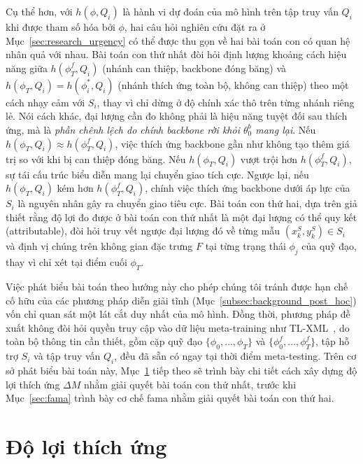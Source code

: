 Cụ thể hơn, với $h(\phi, Q_i)$ là hành vi dự đoán của mô hình trên tập truy vấn $Q_i$ khi được tham số hóa bởi $\phi$, hai câu hỏi nghiên cứu đặt ra ở Mục~\ref{sec:research_urgency} có thể được thu gọn về hai bài toán con có quan hệ nhân quả với nhau. Bài toán con thứ nhất đòi hỏi định lượng khoảng cách hiệu năng giữa $h(\phi_T^{f}, Q_i)$ (nhánh can thiệp, backbone đóng băng) và $h(\phi_T, Q_i) = h(\phi_i^*, Q_i)$ (nhánh thích ứng toàn bộ, không can thiệp) theo một cách nhạy cảm với $S_i$, thay vì chỉ dừng ở độ chính xác thô trên từng nhánh riêng lẻ. Nói cách khác, đại lượng cần đo không phải là hiệu năng tuyệt đối sau thích ứng, mà là \emph{phần chênh lệch do chính backbone rời khỏi $\theta_0^{b}$ mang lại}. Nếu $h(\phi_T, Q_i) \approx h(\phi_T^{f}, Q_i)$, việc thích ứng backbone gần như không tạo thêm giá trị so với khi bị can thiệp đóng băng. Nếu $h(\phi_T, Q_i)$ vượt trội hơn $h(\phi_T^{f}, Q_i)$, sự tái cấu trúc biểu diễn mang lại chuyển giao tích cực. Ngược lại, nếu $h(\phi_T, Q_i)$ kém hơn $h(\phi_T^{f}, Q_i)$, chính việc thích ứng backbone dưới áp lực của $S_i$ là nguyên nhân gây ra chuyển giao tiêu cực. Bài toán con thứ hai, dựa trên giả thiết rằng độ lợi đo được ở bài toán con thứ nhất là một đại lượng có thể quy kết (attributable), đòi hỏi truy vết ngược đại lượng đó về từng mẫu $(x_k^S, y_k^S) \in S_i$ và định vị chúng trên không gian đặc trưng $F$ tại từng trạng thái $\phi_j$ của quỹ đạo, thay vì chỉ xét tại điểm cuối $\phi_T$.

Việc phát biểu bài toán theo hướng này cho phép chúng tôi tránh được hạn chế cố hữu của các phương pháp diễn giải tĩnh (Mục~\ref{subsec:background_post_hoc}) vốn chỉ quan sát một lát cắt duy nhất của mô hình. Đồng thời, phương pháp đề xuất không đòi hỏi quyền truy cập vào dữ liệu meta-training như TL-XML~\cite{mitsuka2025tlxml}, do toàn bộ thông tin cần thiết, gồm cặp quỹ đạo $\{\phi_0, \dots, \phi_T\}$ và $\{\phi_0^{f}, \dots, \phi_T^{f}\}$, tập hỗ trợ $S_i$ và tập truy vấn $Q_i$, đều đã sẵn có ngay tại thời điểm meta-testing. Trên cơ sở phát biểu bài toán này, Mục~\ref{sec:adaptation_gain} tiếp theo sẽ trình bày chi tiết cách xây dựng độ lợi thích ứng $\Delta M$ nhằm giải quyết bài toán con thứ nhất, trước khi Mục~\ref{sec:fama} trình bày cơ chế \acrshort{fama} nhằm giải quyết bài toán con thứ hai.

\section{Độ lợi thích ứng}
\label{sec:adaptation_gain}

